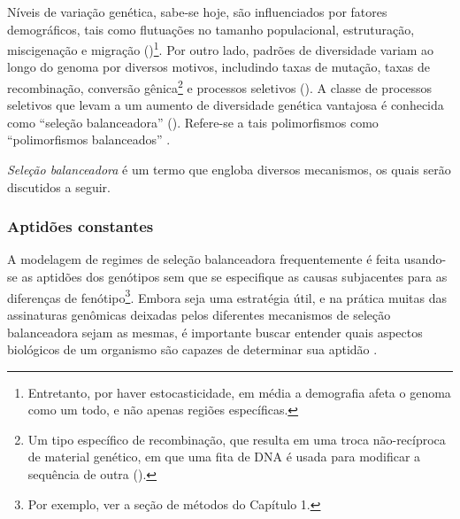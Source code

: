 \begin{refsection}
	Níveis de variação genética, sabe-se hoje, são influenciados por fatores demográficos, tais como flutuações no tamanho populacional, estruturação, miscigenação e migração (\cite{Tishkoff2002})\footnote{Entretanto, por haver estocasticidade, em média a demografia afeta o genoma como um todo, e não apenas regiões específicas.}. Por outro lado, padrões de diversidade variam ao longo do genoma por diversos motivos, includindo taxas de mutação, taxas de recombinação, conversão gênica\footnote{Um tipo específico de recombinação, que resulta em uma troca não-recíproca de material genético, em que uma fita de DNA é usada para modificar a sequência de outra (\cite{Tishkoff2002}).} e processos seletivos (\cite{Tishkoff2002}). A classe de processos seletivos que levam a um aumento de diversidade genética vantajosa é conhecida como \enquote{seleção balanceadora} (\cite{Andres2011,Key2014b}). Refere-se a tais polimorfismos como \enquote{polimorfismos balanceados} \parencite{Charlesworth2010}.

	\emph{Seleção balanceadora} é um termo que engloba diversos mecanismos, os quais serão discutidos a seguir.

\subsubsection{Aptidões constantes} %
	 A modelagem de regimes de seleção balanceadora frequentemente é feita usando-se as aptidões dos genótipos sem que se especifique as causas subjacentes para as diferenças de fenótipo\footnote{Por exemplo, ver a seção de métodos do Capítulo 1.}. Embora seja uma estratégia útil, e na prática muitas das assinaturas genômicas deixadas pelos diferentes mecanismos de seleção balanceadora sejam as mesmas, é importante buscar entender quais aspectos biológicos de um organismo são capazes de determinar sua aptidão \parencite{Charlesworth2010}.


\end{refsection}
